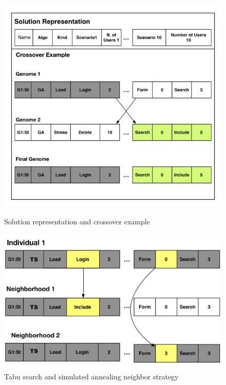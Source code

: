 \documentclass{bmcart}
\begin{document}
\begin{backmatter}
\begin{figure}[h]
\begin{minipage}{.5\textwidth}
\centering
\includegraphics{./images/genomerepresentation1.png}
\caption{Solution representation and crossover example \citep{Gois2016}}
\label{fig:genomarepresentation}
\end{minipage}
\begin{minipage}{.5\textwidth}
\centering
\includegraphics{./images/neighbor.png}
\caption{Tabu search and simulated annealing neighbor strategy \citep{Gois2016}}
\label{fig:neighbourtaby}
\end{minipage}
\end{figure}


\end{backmatter}
\end{document}
